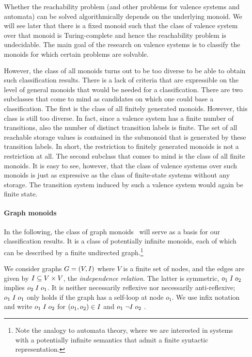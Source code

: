 \documentclass[../../diss.tex]{subfiles}
\begin{document}
Whether the reachability problem (and other problems for valence systems and automata) can be solved algorithmically depends on the underlying monoid.
We will see later that there is a fixed monoid such that the class of valence system over that monoid is Turing-complete and hence the reachability problem is undecidable.
The main goal of the research on valence systems is to classify the monoids for which certain problems are solvable.

However, the class of all monoids turns out to be too diverse to be able to obtain such classification results.
There is a lack of criteria that are expressible on the level of general monoids that would be needed for a classification.
There are two subclasses that come to mind as candidates on which one could base a classification.
The first is the class of all finitely generated monoids.
However, this class is still too diverse.
In fact, since a valence system has a finite number of transitions, also the number of distinct transition labels is finite.
The set of all reachable storage values is contained in the submonoid that is generated by these transition labels.
In short, the restriction to finitely generated monoids is not a restriction at all.
%
The second subclass that comes to mind is the class of all finite monoids.
It is easy to see, however, that the class of valence systems over such monoids is just as expressive as the class of finite-state systems without any storage.
The transition system induced by such a valence system would again be finite state.

\paragraph{Graph monoids}

In the following, the class of graph monoids~\cite{Zetzsche15d,Charney07} will serve as a basis for our classification results.
It is a class of potentially infinite monoids, each of which can be described by a finite undirected graph.\footnote{Note the analogy to automata theory, where we are interested in systems with a potentially infinite semantics that admit a finite syntactic representation.}

We consider graphs $G = (V,I)$ where $V$ is a finite set of nodes, and the edges are given by $I \subseteq V \times V$, the \emph{independence relation}.
The latter is symmetric, \ie $o_1 \mathrel{I} o_2$ implies $o_2 \mathrel{I} o_1$.
It is neither necessarily reflexive nor necessarily anti-reflexive; $o_1 \mathrel{I} o_1$ only holds if the graph has a self-loop at node $o_1$.
We use infix notation and write $o_1 \mathrel{I} o_2$ for $(o_1, o_2) \in I$ and $o_1 \mathrel{\neg I} o_2$ .
\end{document}
